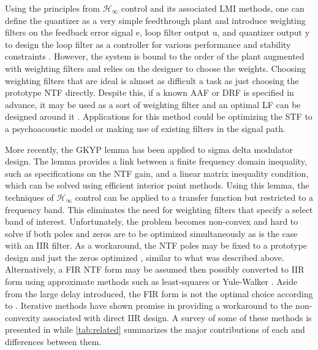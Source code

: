 Using the principles from $\mathcal{H}_\infty$ control and its associated \gls{LMI} methods, one can define the quantizer as a very simple feedthrough plant and introduce weighting filters on the feedback error signal \gls{e}, loop filter output \gls{u}, and quantizer output \gls{y} to design the loop filter as a controller for various performance and stability constraints \cite{Oberoi2004}. However, the system is bound to the order of the plant augmented with weighting filters and relies on the designer to choose the weights. Choosing weighting filters that are ideal is almost as difficult a task as just choosing the prototype \gls{NTF} directly. Despite this, if a known \gls{AAF} or \gls{DRF} is specified in advance, it may be used as a sort of weighting filter and an optimal \gls{LF} can be designed around it \cite{Ohno2017b}. Applications for this method could be optimizing the \gls{STF} to a psychoacoustic model or making use of existing filters in the signal path.

More recently, the \gls{GKYP} lemma has been applied to sigma delta modulator design. The lemma provides a link between a finite frequency domain inequality, such as specifications on the \gls{NTF} gain, and a linear matrix inequality condition, which can be solved using efficient interior point methods. Using this lemma, the techniques of $\mathcal{H}_\infty$ control can be applied to a transfer function but restricted to a frequency band. This eliminates the need for weighting filters that specify a select band of interest. Unfortunately, the problem becomes non-convex and hard to solve if both poles and zeros are to be optimized simultaneously as is the case with an \gls{IIR} filter. As a workaround, the \gls{NTF} poles may be fixed to a prototype design and just the zeros optimized \cite{Osqui2007}, similar to what was described above. Alternatively, a \gls{FIR} \gls{NTF} form may be assumed \cite{Nagahara2012, Tariq2016} then possibly converted to \gls{IIR} form using approximate methods such as least-squares or Yule-Walker \cite{Tariq2017}. Aside from the large delay introduced, the \gls{FIR} form is not the optimal choice according to \cite{Derpich2008}. Iterative methods have shown promise in providing a workaround to the non-convexity associated with direct \gls{IIR} design. A survey of some of these methods is presented in \cite{Callegari2015} while \autoref{tab:related} summarizes the major contributions of each and differences between them.

